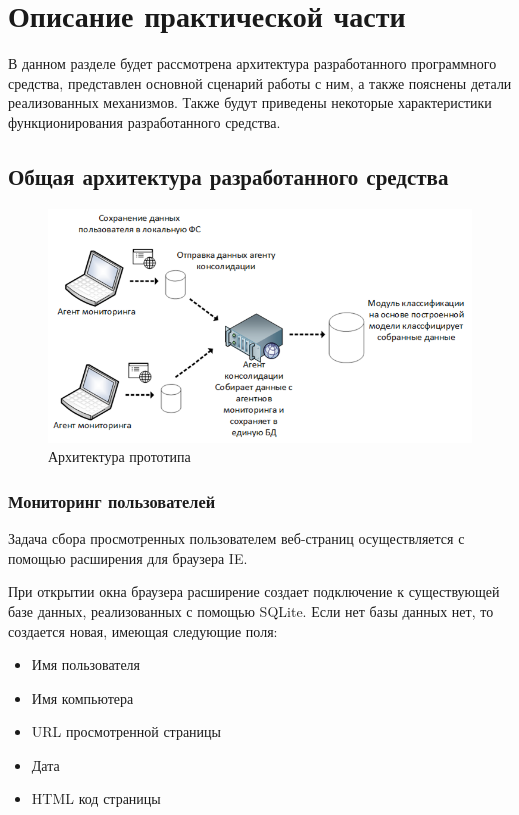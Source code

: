 \documentclass[russian, utf8, emptystyle]{eskdtext}
\begin{document}
\section{Описание практической части}
В данном разделе будет рассмотрена архитектура разработанного программного средства, представлен основной сценарий работы с ним, а также пояснены детали реализованных механизмов. Также будут приведены некоторые характеристики функционирования разработанного средства.
\subsection{Общая архитектура разработанного средства}
	\begin{figure}[h]
		\begin{center}
			\includegraphics[width=12cm]{pic/arch.png}
			\caption{Архитектура прототипа}
			\label{fig:low_sigma}
		\end{center}
	\end{figure}
\subsubsection{Мониторинг пользователей}
Задача сбора просмотренных пользователем веб-страниц осуществляется с помощью расширения для браузера IE.

При открытии окна браузера расширение создает подключение к существующей базе данных, реализованных с помощью SQLite. Если нет базы данных нет, то создается новая, имеющая следующие поля:
\begin{itemize}
	\item Имя пользователя
	\item Имя компьютера
	\item URL просмотренной страницы
	\item Дата
	\item HTML код страницы
\end{itemize}
\end{document}
